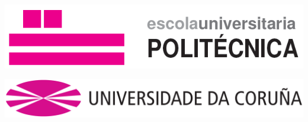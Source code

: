 \documentclass[10pt,a4paper]{article}
\begin{document}
\thispagestyle{empty}

\hspace{4.7cm}
\begin{minipage}{0.23\textwidth}




\end{minipage}
\begin{minipage}{0.28\textwidth}

\includegraphics[scale=0.4]{pics/EUP.png}



\end{minipage}

\vspace{1cm}
\hspace{3.4cm}
\begin{minipage}{0.25\textwidth}
\includegraphics[scale=0.3]{pics/udc_logo.png}
\end{minipage}
\end{document}
